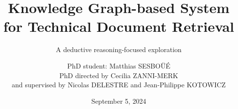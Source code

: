 

\title{Knowledge Graph-based System for Technical Document Retrieval}
\subtitle{A deductive reasoning-focused exploration}
\author{PhD student: Matthias SESBO{\"U}{\'E}\\PhD directed by Cecilia ZANNI-MERK\\and supervised by Nicolas DELESTRE and Jean-Philippe KOTOWICZ}
\date{September 5, 2024}


    \frame{\titlepage}
    
    
    

    
    

    

    
    
    


